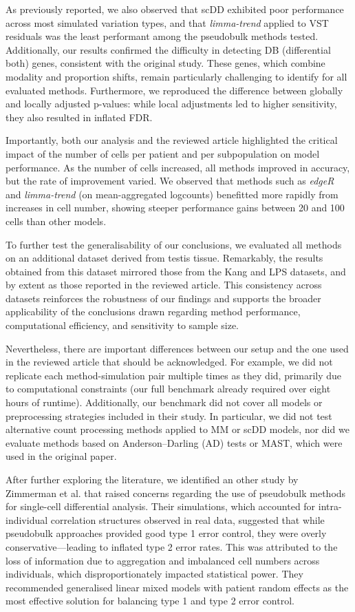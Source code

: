 \documentclass[a4paper, 11pt, twocolumn]{article}
\begin{document}
\begin{multicols}{2}
As previously reported, we also observed that scDD exhibited poor performance across most simulated variation types, and that \textit{limma-trend} applied to VST residuals was the least performant among the pseudobulk methods tested. Additionally, our results confirmed the difficulty in detecting DB (differential both) genes, consistent with the original study. These genes, which combine modality and proportion shifts, remain particularly challenging to identify for all evaluated methods. Furthermore, we reproduced the difference between globally and locally adjusted p-values: while local adjustments led to higher sensitivity, they also resulted in inflated FDR.

Importantly, both our analysis and the reviewed article highlighted the critical impact of the number of cells per patient and per subpopulation on model performance. As the number of cells increased, all methods improved in accuracy, but the rate of improvement varied. We observed that methods such as \textit{edgeR} and \textit{limma-trend} (on mean-aggregated logcounts) benefitted more rapidly from increases in cell number, showing steeper performance gains between 20 and 100 cells than other models.

To further test the generalisability of our conclusions, we evaluated all methods on an additional dataset derived from testis tissue. Remarkably, the results obtained from this dataset mirrored those from the Kang and LPS datasets, and by extent as those reported in the reviewed article. This consistency across datasets reinforces the robustness of our findings and supports the broader applicability of the conclusions drawn regarding method performance, computational efficiency, and sensitivity to sample size.

Nevertheless, there are important differences between our setup and the one used in the reviewed article that should be acknowledged. For example, we did not replicate each method-simulation pair multiple times as they did, primarily due to computational constraints (our full benchmark already required over eight hours of runtime). Additionally, our benchmark did not cover all models or preprocessing strategies included in their study. In particular, we did not test alternative count processing methods applied to MM or scDD models, nor did we evaluate methods based on Anderson–Darling (AD) tests or MAST, which were used in the original paper.

After further exploring the literature, we identified an other study by Zimmerman et al. \citep{zimmerman2021practical} that raised concerns regarding the use of pseudobulk methods for single-cell differential analysis. Their simulations, which accounted for intra-individual correlation structures observed in real data, suggested that while pseudobulk approaches provided good type 1 error control, they were overly conservative—leading to inflated type 2 error rates. This was attributed to the loss of information due to aggregation and imbalanced cell numbers across individuals, which disproportionately impacted statistical power. They recommended generalised linear mixed models  with patient random effects as the most effective solution for balancing type 1 and type 2 error control.


\end{multicols}
\end{document}
